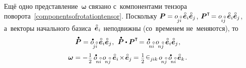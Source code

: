 \begin{otherlanguage}{russian}
Ещё одно представление~$\bm{\omega}$ связано с~компонентами тензора поворота~\eqref{componentsofrotationtensor}. Поскольку ${\bm{P} = \cosinematrix{\!j\mathcircabove{i}} \hspace{.4ex} \mathcircabove{\bm{e}}_i \mathcircabove{\bm{e}}_j}$, ${\bm{P}^{\T} \hspace{-0.32ex} = \cosinematrix{\hspace{-0.2ex}i\mathcircabove{j}} \hspace{.4ex} \mathcircabove{\bm{e}}_i \mathcircabove{\bm{e}}_j}$, а~векторы начального базиса~${\mathcircabove{\bm{e}}_i}$ неподвижны (со~временем не~меняются), то
\nopagebreak\vspace{.25em}\[ \mathdotabove{\bm{P}} = \cosinematrixdotted{\!j\mathcircabove{i}} \hspace{.4ex} \mathcircabove{\bm{e}}_i \mathcircabove{\bm{e}}_j
\hspace{.1ex} , \:\,
\mathdotabove{\bm{P}} \dotp \bm{P}^{\T} \hspace{-0.32ex} = \hspace{.1ex} \cosinematrixdotted{\hspace{-0.4ex}n\mathcircabove{i}} \hspace{.4ex} \cosinematrix{\hspace{-0.4ex}n\mathcircabove{j}} \hspace{.4ex} \mathcircabove{\bm{e}}_i \mathcircabove{\bm{e}}_j
\hspace{.1ex}, \]
\nopagebreak\vspace{-0.64em}\begin{equation}
\bm{\omega} = - \hspace{.1ex} \smalldisplaystyleonehalf \hspace{.4ex} \cosinematrixdotted{\hspace{-0.4ex}n\mathcircabove{i}} \hspace{.4ex} \cosinematrix{\hspace{-0.4ex}n\mathcircabove{j}} \hspace{.5ex} \mathcircabove{\bm{e}}_i \hspace{-0.3ex}\times\hspace{-0.3ex} \mathcircabove{\bm{e}}_j \hspace{-0.1ex} =
\smalldisplaystyleonehalf \hspace{.2ex} \levicivita_{j\hspace{-0.06ex}ik} \hspace{.32ex} \cosinematrix{\hspace{-0.4ex}n\mathcircabove{j}} \hspace{.4ex} \cosinematrixdotted{\hspace{-0.4ex}n\mathcircabove{i}} \hspace{.4ex} \mathcircabove{\bm{e}}_k
\hspace{.2ex} .
\end{equation}


\end{otherlanguage}
